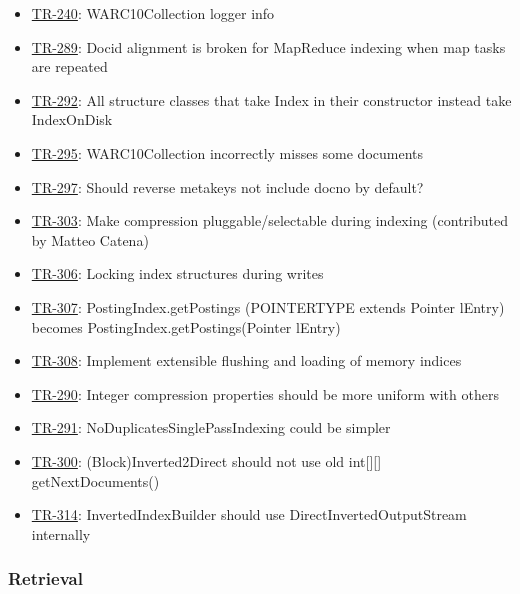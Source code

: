 \begin{itemize}
\tightlist
\item
  \href{http://terrier.org/issues/browse/TR-240}{TR-240}:
  WARC10Collection logger info
\item
  \href{http://terrier.org/issues/browse/TR-289}{TR-289}: Docid
  alignment is broken for MapReduce indexing when map tasks are repeated
\item
  \href{http://terrier.org/issues/browse/TR-292}{TR-292}: All structure
  classes that take Index in their constructor instead take IndexOnDisk
\item
  \href{http://terrier.org/issues/browse/TR-295}{TR-295}:
  WARC10Collection incorrectly misses some documents
\item
  \href{http://terrier.org/issues/browse/TR-297}{TR-297}: Should reverse
  metakeys not include docno by default?
\item
  \href{http://terrier.org/issues/browse/TR-303}{TR-303}: Make
  compression pluggable/selectable during indexing (contributed by
  Matteo Catena)
\item
  \href{http://terrier.org/issues/browse/TR-306}{TR-306}: Locking index
  structures during writes
\item
  \href{http://terrier.org/issues/browse/TR-307}{TR-307}:
  PostingIndex.getPostings (POINTERTYPE extends Pointer lEntry) becomes
  PostingIndex.getPostings(Pointer lEntry)
\item
  \href{http://terrier.org/issues/browse/TR-308}{TR-308}: Implement
  extensible flushing and loading of memory indices
\item
  \href{http://terrier.org/issues/browse/TR-290}{TR-290}: Integer
  compression properties should be more uniform with others
\item
  \href{http://terrier.org/issues/browse/TR-291}{TR-291}:
  NoDuplicatesSinglePassIndexing could be simpler
\item
  \href{http://terrier.org/issues/browse/TR-300}{TR-300}:
  (Block)Inverted2Direct should not use old int{[}{]}{[}{]}
  getNextDocuments()
\item
  \href{http://terrier.org/issues/browse/TR-314}{TR-314}:
  InvertedIndexBuilder should use DirectInvertedOutputStream internally
\end{itemize}

\subsubsection{Retrieval}\label{retrieval-1}

